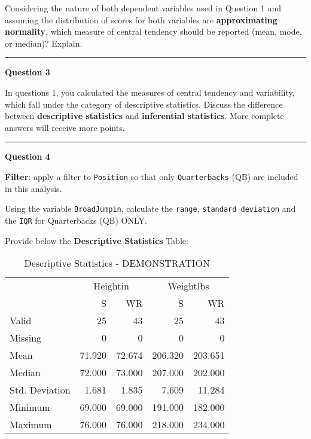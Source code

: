 \documentclass[11pt,]{article}
\begin{document}
Considering the nature of both dependent variables used in Question 1
and assuming the distribution of scores for both variables are
\textbf{approximating normality}, which measure of central tendency
should be reported (mean, mode, or median)? Explain.

\begin{center}\rule{0.5\linewidth}{0.5pt}\end{center}

\textbf{Question 3}

In questions 1, you calculated the measures of central tendency and
variability, which fall under the category of descriptive statistics.
Discuss the difference between \textbf{descriptive statistics} and
\textbf{inferential statistics}. More complete answers will receive more
points.

\begin{center}\rule{0.5\linewidth}{0.5pt}\end{center}

\textbf{Question 4}

\textbf{Filter}: apply a filter to \texttt{Position} so that only
\texttt{Quarterbacks} (QB) are included in this analysis.

Using the variable \texttt{BroadJumpin}, calculate the \texttt{range},
\texttt{standard\ deviation} and the \texttt{IQR} for Quarterbacks (QB)
ONLY.

Provide below the \textbf{Descriptive Statistics} Table:

\begin{table}[h]
    \centering
    \caption{Descriptive Statistics - DEMONSTRATION}
    \label{tab:descriptiveStatistics}
    {
        \begin{tabular}{lrrrr}
            \toprule
            \multicolumn{1}{c}{} & \multicolumn{2}{c}{Heightin} & \multicolumn{2}{c}{Weightlbs} \\
            \cline{2-3}\cline{4-5}
             & S & WR & S & WR  \\
            \cmidrule[0.4pt]{1-5}
            Valid & 25 & 43 & 25 & 43  \\
            Missing & 0 & 0 & 0 & 0  \\
            Mean & 71.920 & 72.674 & 206.320 & 203.651  \\
            Median & 72.000 & 73.000 & 207.000 & 202.000  \\
            Std. Deviation & 1.681 & 1.835 & 7.609 & 11.284  \\
            Minimum & 69.000 & 69.000 & 191.000 & 182.000  \\
            Maximum & 76.000 & 76.000 & 218.000 & 234.000  \\
            \bottomrule
        \end{tabular}
    }
\end{table}
\end{document}
